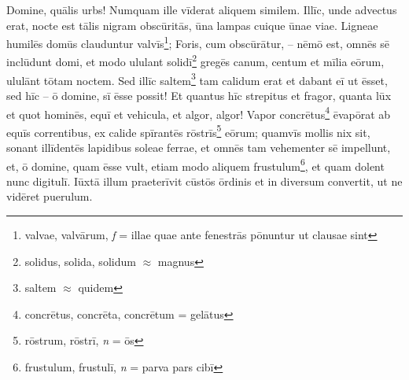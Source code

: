 \documentclass[a4paper, 12pt]{article}
\begin{document}
\begin{linenumbers}
	Domine, quālis urbs!
	Numquam ille vīderat aliquem similem.
	Illīc, unde advectus erat, nocte est tālis nigram obscūritās, ūna lampas cuique ūnae viae.
	Ligneae humilēs domūs clauduntur valvīs\footnote{valvae, valvārum, \textit{f} = illae quae ante fenestrās pōnuntur ut clausae sint};
	Foris, cum obscūrātur, -- nēmō est, omnēs sē inclūdunt domi, et modo ululant solidī\footnote{solidus, solida, solidum $\approx$ magnus} gregēs canum, centum et m\={i}lia eōrum, ululānt tōtam noctem.
	Sed illīc saltem\footnote{saltem $\approx$ quidem} tam calidum erat et dabant eī ut ēsset, sed h\={i}c -- ō domine, sī ēsse possit!
	Et quantus hīc strepitus et fragor, quanta lūx et quot hominēs, equī et vehicula, et algor, algor!
	Vapor concrētus\footnote{concrētus, concrēta, concrētum = gelātus} ēvapōrat ab equīs correntibus, ex calide spīrantēs rōstrīs\footnote{rōstrum, rōstrī, \textit{n} = ōs} eōrum; quamv\={i}s mollis nix sit, sonant illīdentēs lapidibus soleae ferrae, et omnēs tam vehementer sē impellunt, et, ō domine, quam ēsse vult, etiam modo aliquem frustulum\footnote{frustulum, frustulī, \textit{n} = parva pars cibī}, et quam dolent nunc digitulī.
	Iūxtā illum praeterīvit cūstōs ōrdinis et in diversum convertit, ut ne vidēret puerulum.
	

\end{linenumbers}
\end{document}
